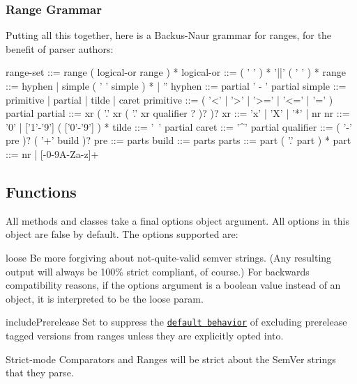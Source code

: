 \subsubsection*{Range Grammar}

Putting all this together, here is a Backus-\/\+Naur grammar for ranges, for the benefit of parser authors\+:


\begin{DoxyCode}
range-set  ::= range ( logical-or range ) *
logical-or ::= ( ' ' ) * '||' ( ' ' ) *
range      ::= hyphen | simple ( ' ' simple ) * | ''
hyphen     ::= partial ' - ' partial
simple     ::= primitive | partial | tilde | caret
primitive  ::= ( '<' | '>' | '>=' | '<=' | '=' ) partial
partial    ::= xr ( '.' xr ( '.' xr qualifier ? )? )?
xr         ::= 'x' | 'X' | '*' | nr
nr         ::= '0' | ['1'-'9'] ( ['0'-'9'] ) *
tilde      ::= '~' partial
caret      ::= '^' partial
qualifier  ::= ( '-' pre )? ( '+' build )?
pre        ::= parts
build      ::= parts
parts      ::= part ( '.' part ) *
part       ::= nr | [-0-9A-Za-z]+
\end{DoxyCode}


\subsection*{Functions}

All methods and classes take a final {\ttfamily options} object argument. All options in this object are {\ttfamily false} by default. The options supported are\+:


\begin{DoxyItemize}
\item {\ttfamily loose} Be more forgiving about not-\/quite-\/valid semver strings. (Any resulting output will always be 100\% strict compliant, of course.) For backwards compatibility reasons, if the {\ttfamily options} argument is a boolean value instead of an object, it is interpreted to be the {\ttfamily loose} param.
\item {\ttfamily include\+Prerelease} Set to suppress the \href{https://github.com/npm/node-semver#prerelease-tags}{\tt default behavior} of excluding prerelease tagged versions from ranges unless they are explicitly opted into.
\end{DoxyItemize}

Strict-\/mode Comparators and Ranges will be strict about the Sem\+Ver strings that they parse.


